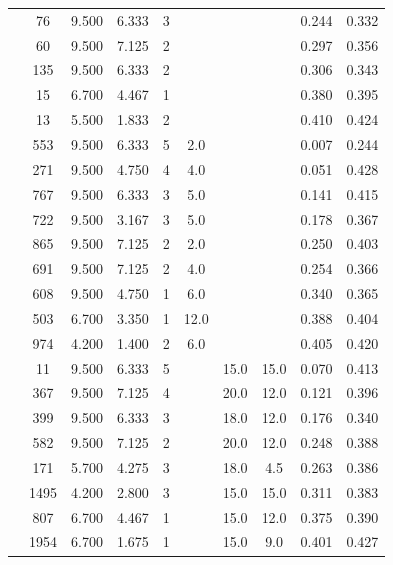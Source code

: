 \begin{table}
{\begin{tabular}{l S[table-format=2.0] S[table-format=1.3]
        S[table-format=1.3] S[table-format=1.0] S[table-format=2.1] S[table-format=2.1]
        S[table-format=2.1] S[table-format=1.3] S[table-format=1.3]}
                    &   76 & 9.500 & 6.333 & 3 &      &      &      & 0.244 & 0.332 \\
                    &   60 & 9.500 & 7.125 & 2 &      &      &      & 0.297 & 0.356 \\
                    &  135 & 9.500 & 6.333 & 2 &      &      &      & 0.306 & 0.343 \\
                    &   15 & 6.700 & 4.467 & 1 &      &      &      & 0.380 & 0.395 \\
                    &   13 & 5.500 & 1.833 & 2 &      &      &      & 0.410 & 0.424 \\
        \addlinespace[0.5em]
        \fact{}     &  553 & 9.500 & 6.333 & 5 &  2.0 &      &      & 0.007 & 0.244\\
                    &  271 & 9.500 & 4.750 & 4 &  4.0 &      &      & 0.051 & 0.428\\
                    &  767 & 9.500 & 6.333 & 3 &  5.0 &      &      & 0.141 & 0.415\\
                    &  722 & 9.500 & 3.167 & 3 &  5.0 &      &      & 0.178 & 0.367\\
                    &  865 & 9.500 & 7.125 & 2 &  2.0 &      &      & 0.250 & 0.403\\
                    &  691 & 9.500 & 7.125 & 2 &  4.0 &      &      & 0.254 & 0.366\\
                    &  608 & 9.500 & 4.750 & 1 &  6.0 &      &      & 0.340 & 0.365\\
                    &  503 & 6.700 & 3.350 & 1 & 12.0 &      &      & 0.388 & 0.404\\
                    &  974 & 4.200 & 1.400 & 2 &  6.0 &      &      & 0.405 & 0.420\\
        \addlinespace[0.5em]
        \tcc{}      &   11 & 9.500 & 6.333 & 5 &      & 15.0 & 15.0 & 0.070 & 0.413\\
                    &  367 & 9.500 & 7.125 & 4 &      & 20.0 & 12.0 & 0.121 & 0.396\\
                    &  399 & 9.500 & 6.333 & 3 &      & 18.0 & 12.0 & 0.176 & 0.340\\
                    &  582 & 9.500 & 7.125 & 2 &      & 20.0 & 12.0 & 0.248 & 0.388\\
                    &  171 & 5.700 & 4.275 & 3 &      & 18.0 &  4.5 & 0.263 & 0.386\\
                    & 1495 & 4.200 & 2.800 & 3 &      & 15.0 & 15.0 & 0.311 & 0.383\\
                    &  807 & 6.700 & 4.467 & 1 &      & 15.0 & 12.0 & 0.375 & 0.390\\
                    & 1954 & 6.700 & 1.675 & 1 &      & 15.0 &  9.0 & 0.401 & 0.427\\
    \end{tabular}}
\end{table}